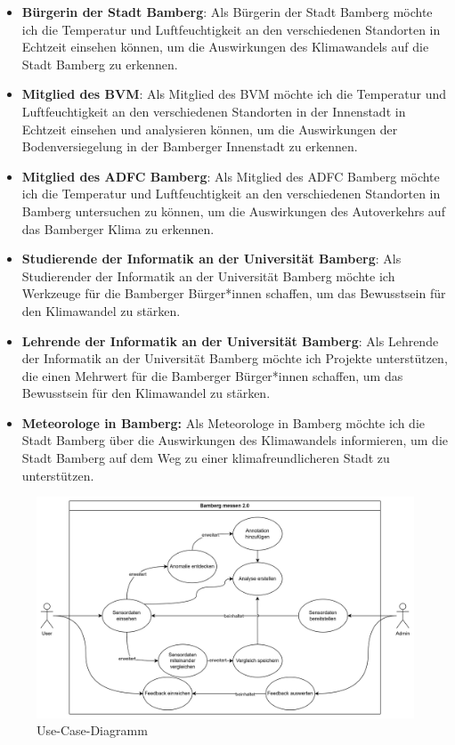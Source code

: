 \begin{itemize}
    \item \textbf{Bürgerin der Stadt Bamberg}: Als Bürgerin der Stadt Bamberg möchte ich die Temperatur und Luftfeuchtigkeit an den verschiedenen Standorten in Echtzeit einsehen können, um die Auswirkungen des Klimawandels auf die Stadt Bamberg zu erkennen.
    \item \textbf{Mitglied des \ac{BVM}}: Als Mitglied des \ac{BVM} möchte ich die Temperatur und Luftfeuchtigkeit an den verschiedenen Standorten in der Innenstadt in Echtzeit einsehen und analysieren können, um die Auswirkungen der Bodenversiegelung in der Bamberger Innenstadt zu erkennen.
    \item \textbf{Mitglied des \ac{ADFC} Bamberg}: Als Mitglied des \ac{ADFC} Bamberg möchte ich die Temperatur und Luftfeuchtigkeit an den verschiedenen Standorten in Bamberg untersuchen zu können, um die Auswirkungen des Autoverkehrs auf das Bamberger Klima zu erkennen.
    \item \textbf{Studierende der Informatik an der Universität Bamberg}: Als Studierender der Informatik an der Universität Bamberg möchte ich Werkzeuge für die Bamberger Bürger*innen schaffen, um das Bewusstsein für den Klimawandel zu stärken.
    \item \textbf{Lehrende der Informatik an der Universität Bamberg}: Als Lehrende der Informatik an der Universität Bamberg möchte ich Projekte unterstützen, die einen Mehrwert für die Bamberger Bürger*innen schaffen, um das Bewusstsein für den Klimawandel zu stärken.
    \item \textbf{Meteorologe in Bamberg:} Als Meteorologe in Bamberg möchte ich die Stadt Bamberg über die Auswirkungen des Klimawandels informieren, um die Stadt Bamberg auf dem Weg zu einer klimafreundlicheren Stadt zu unterstützen.
\end{itemize}

\begin{figure}[t]
    \centering
    \includegraphics[width=1.5\textwidth]{figures/usecases.png}
    \decoRule
    \caption[Use-Case-Diagramm]{Use-Case-Diagramm}
    \label{fig:usecase_diagram}
\end{figure}

